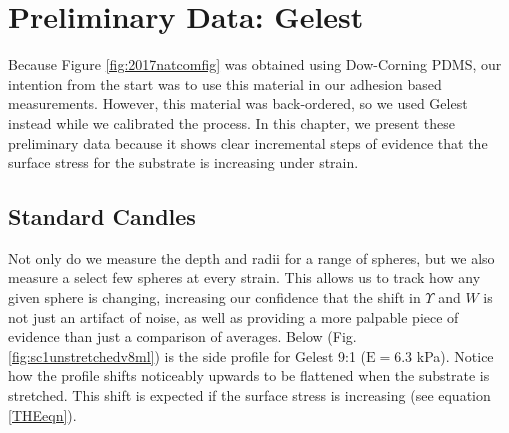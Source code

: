\section{Preliminary Data: Gelest}
Because Figure \ref{fig:2017natcomfig} was obtained using Dow-Corning PDMS, our intention from the start was to use this material in our adhesion based measurements. However, this material was back-ordered, so we used Gelest instead while we calibrated the process. In this chapter, we present these preliminary data because it shows clear incremental steps of evidence that the surface stress for the substrate is increasing under strain.  

\subsection{Standard Candles}
Not only do we measure the depth and radii for a range of spheres, but we also measure a select few spheres at every strain. This allows us to track how any given sphere is changing, increasing our confidence that the shift in $\Upsilon$ and $ W $ is not just an artifact of noise, as well as providing a more palpable piece of evidence than just a comparison of averages. Below (Fig. \ref{fig:sc1unstretchedv8ml}) is the side profile for Gelest 9:1 ($\text{E}=6.3$ kPa). Notice how the profile shifts noticeably upwards to be flattened when the substrate is stretched. This shift is expected if the surface stress is increasing (see equation \ref{THEeqn}).

